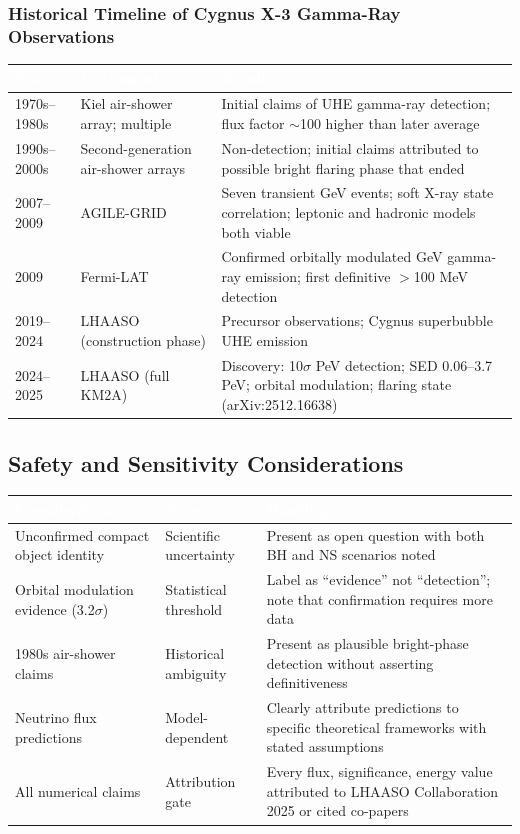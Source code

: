 \documentclass[11pt,letterpaper]{article}
\newcommand{\tableheader}[1]{\textbf{\sffamily\textcolor{white}{#1}}}
\begin{document}
\subsubsection{Historical Timeline of Cygnus X-3 Gamma-Ray Observations}

\begin{center}
\begin{tabularx}{\textwidth}{C{2.2cm}L{3cm}X}
\toprule
{}
\tableheader{Era} & \tableheader{Instrument} & \tableheader{Result} \\
\midrule
1970s--1980s & Kiel air-shower array; multiple & Initial claims of UHE gamma-ray detection; flux factor $\sim$100 higher than later average \\
1990s--2000s & Second-generation air-shower arrays & Non-detection; initial claims attributed to possible bright flaring phase that ended \\
2007--2009 & AGILE-GRID & Seven transient GeV events; soft X-ray state correlation; leptonic and hadronic models both viable \\
2009 & Fermi-LAT & Confirmed orbitally modulated GeV gamma-ray emission; first definitive $>$100 MeV detection \\
2019--2024 & LHAASO (construction phase) & Precursor observations; Cygnus superbubble UHE emission \\
2024--2025 & LHAASO (full KM2A) & Discovery: 10$\sigma$ PeV detection; SED 0.06--3.7 PeV; orbital modulation; flaring state (arXiv:2512.16638) \\
\bottomrule
\end{tabularx}
\end{center}

\subsection{Safety and Sensitivity Considerations}

\begin{center}
\begin{tabularx}{\textwidth}{L{3.5cm}L{2cm}X}
\toprule
{}
\tableheader{Consideration} & \tableheader{Type} & \tableheader{Handling} \\
\midrule
Unconfirmed compact object identity & Scientific uncertainty & Present as open question with both BH and NS scenarios noted \\
Orbital modulation evidence (3.2$\sigma$) & Statistical threshold & Label as ``evidence'' not ``detection''; note that confirmation requires more data \\
1980s air-shower claims & Historical ambiguity & Present as plausible bright-phase detection without asserting definitiveness \\
Neutrino flux predictions & Model-dependent & Clearly attribute predictions to specific theoretical frameworks with stated assumptions \\
All numerical claims & Attribution gate & Every flux, significance, energy value attributed to LHAASO Collaboration 2025 or cited co-papers \\
\bottomrule
\end{tabularx}
\end{center}
\end{document}
